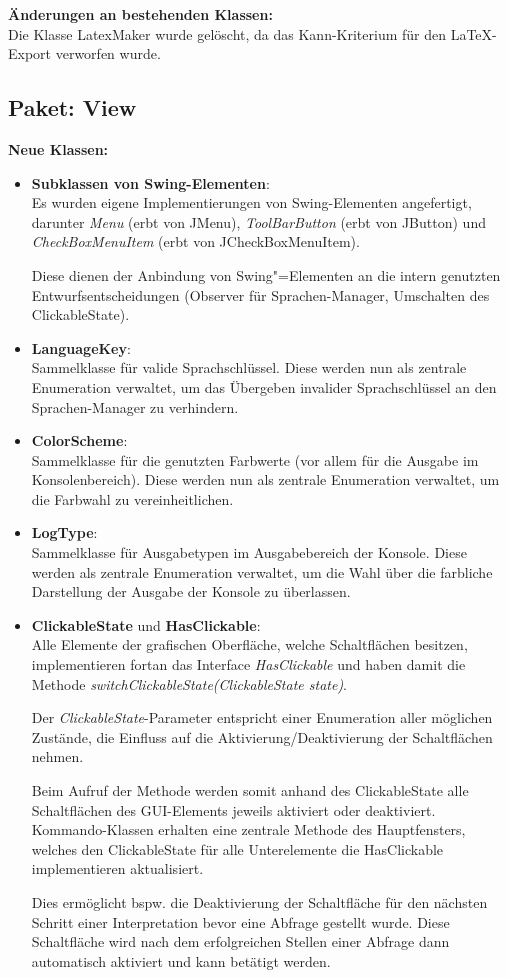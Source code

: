 \documentclass[parskip=full,11pt,twoside]{scrartcl}
\begin{document}
\textbf{Änderungen an bestehenden Klassen:}\\
Die Klasse LatexMaker wurde gelöscht, da das Kann-Kriterium für den LaTeX-Export verworfen wurde.

\subsection{Paket: View}

\textbf{Neue Klassen:}
\begin{itemize}
	\item \textbf{Subklassen von Swing-Elementen}:\\
	Es wurden eigene Implementierungen von Swing-Elementen angefertigt, darunter \textit{Menu} (erbt von JMenu), \textit{ToolBarButton} (erbt von JButton) und \textit{CheckBoxMenuItem} (erbt von JCheckBoxMenuItem).
	
	Diese dienen der Anbindung von Swing"=Elementen an die intern genutzten Entwurfsentscheidungen (Observer für Sprachen-Manager, Umschalten des ClickableState).
	\item \textbf{LanguageKey}:\\
	Sammelklasse für valide Sprachschlüssel. Diese werden nun als zentrale Enumeration verwaltet, um das Übergeben invalider Sprachschlüssel an den Sprachen-Manager zu verhindern.
	\item \textbf{ColorScheme}:\\
	Sammelklasse für die genutzten Farbwerte (vor allem für die Ausgabe im Konsolenbereich). Diese werden nun als zentrale Enumeration verwaltet, um die Farbwahl zu vereinheitlichen.
	\item \textbf{LogType}:\\
	Sammelklasse für Ausgabetypen im Ausgabebereich der Konsole. Diese werden als zentrale Enumeration verwaltet, um die Wahl über die farbliche Darstellung der Ausgabe der Konsole zu überlassen.
	\item \textbf{ClickableState} und \textbf{HasClickable}:\\
	Alle Elemente der grafischen Oberfläche, welche Schaltflächen besitzen, implementieren fortan das Interface \textit{HasClickable} und haben damit die Methode \textit{switchClickableState(ClickableState state)}.
	
	Der \textit{ClickableState}-Parameter entspricht einer Enumeration aller möglichen Zustände, die Einfluss auf die Aktivierung/Deaktivierung der Schaltflächen nehmen.
	
	Beim Aufruf der Methode werden somit anhand des ClickableState alle Schaltflächen des GUI-Elements jeweils aktiviert oder deaktiviert. Kommando-Klassen erhalten eine zentrale Methode des Hauptfensters, welches den ClickableState für alle Unterelemente die HasClickable implementieren aktualisiert.
	
	Dies ermöglicht bspw. die Deaktivierung der Schaltfläche für den nächsten Schritt einer Interpretation bevor eine Abfrage gestellt wurde. Diese Schaltfläche wird nach dem erfolgreichen Stellen einer Abfrage dann automatisch aktiviert und kann betätigt werden.
\end{itemize}
\end{document}
